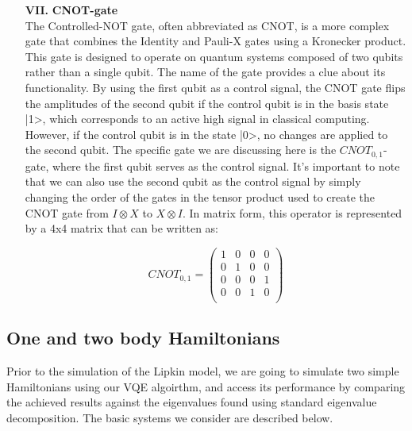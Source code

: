 \documentclass[onecolumn,10pt,cleanfoot]{asme2ej}
\begin{document}
\begin{enumerate}
	\item[\textbf{VII.}] \textbf{CNOT-gate} \\
		The Controlled-NOT gate, often abbreviated as CNOT, is a more complex gate that combines the Identity and Pauli-X gates using a Kronecker product. This gate is designed to operate on quantum systems composed of two qubits rather than a single qubit. The name of the gate provides a clue about its functionality. By using the first qubit as a control signal, the CNOT gate flips the amplitudes of the second qubit if the control qubit is in the basis state |1>, which corresponds to an active high signal in classical computing. However, if the control qubit is in the state |0>, no changes are applied to the second qubit. The specific gate we are discussing here is the $CNOT_{0,1}$-gate, where the first qubit serves as the control signal.
		It's important to note that we can also use the second qubit as the control signal by simply changing the order of the gates in the tensor product used to create the CNOT gate from $I \otimes X$ to $X \otimes I$. In matrix form, this operator is represented by a 4x4 matrix that can be written as:
		
		\begin{equation*}
		 CNOT_{0,1} = \begin{pmatrix}
			1 & 0 & 0 & 0 \\
			0 & 1 & 0 & 0 \\
			0 & 0 & 0 & 1 \\
			0 & 0 & 1 & 0 \\
		\end{pmatrix}
	\end{equation*}

\end{enumerate}

\subsection{One and two body Hamiltonians} 
Prior to the simulation of the Lipkin model, we are going to simulate two simple Hamiltonians using our VQE algoirthm, and access its performance by comparing the achieved results against the eigenvalues found using standard eigenvalue decomposition. The basic systems we consider are described below. 
\end{document}
